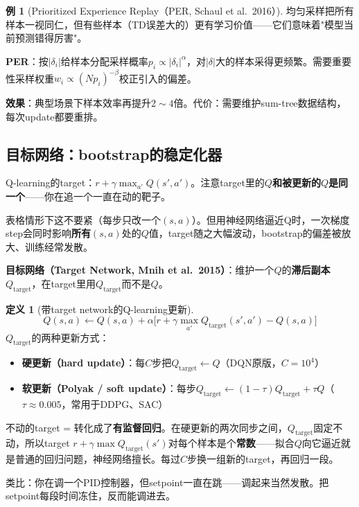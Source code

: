 \documentclass[11pt,a4paper]{article}
\theoremstyle{definition}
\newtheorem{definition}{定义}[section]
\newtheorem{example}{例}[section]
\begin{document}
\begin{example}[Prioritized Experience Replay（PER, Schaul et al.\ 2016）]
均匀采样把所有样本一视同仁，但有些样本（TD误差大的）更有学习价值——它们意味着"模型当前预测错得厉害"。

\textbf{PER}：按$|\delta_i|$给样本分配采样概率$p_i \propto |\delta_i|^\alpha$，对$|\delta|$大的样本采得更频繁。需要重要性采样权重$w_i \propto (Np_i)^{-\beta}$校正引入的偏差。

\textbf{效果}：典型场景下样本效率再提升$2\sim 4$倍。代价：需要维护sum-tree数据结构，每次update都要重排。
\end{example}

\subsection{目标网络：bootstrap的稳定化器}

\begin{plainwords}
Q-learning的target：$r + \gamma\max_{a'} Q(s', a')$。注意target里的$Q$\textbf{和被更新的$Q$是同一个}——你在追一个一直在动的靶子。

表格情形下这不要紧（每步只改一个$(s,a)$）。但用神经网络逼近Q时，一次梯度step会同时影响\textbf{所有}$(s, a)$处的$Q$值，target随之大幅波动，bootstrap的偏差被放大、训练经常发散。

\textbf{目标网络（Target Network, Mnih et al.\ 2015）}：维护一个$Q$的\textbf{滞后副本}$Q_{\text{target}}$，在target里用$Q_{\text{target}}$而不是$Q$。
\end{plainwords}

\begin{definition}[带target network的Q-learning更新]
\[
Q(s,a) \leftarrow Q(s,a) + \alpha\Big[r + \gamma\max_{a'} Q_{\text{target}}(s', a') - Q(s,a)\Big]
\]
$Q_{\text{target}}$的两种更新方式：
\begin{itemize}
\item \textbf{硬更新（hard update）}：每$C$步把$Q_{\text{target}} \leftarrow Q$（DQN原版，$C=10^4$）
\item \textbf{软更新（Polyak / soft update）}：每步$Q_{\text{target}} \leftarrow (1-\tau)Q_{\text{target}} + \tau Q$（$\tau \approx 0.005$，常用于DDPG、SAC）
\end{itemize}
\end{definition}

\begin{intuition}[为什么这样稳定]
不动的target = 转化成了\textbf{有监督回归}。在硬更新的两次同步之间，$Q_{\text{target}}$固定不动，所以target $r + \gamma\max Q_{\text{target}}(s')$对每个样本是个\textbf{常数}——拟合$Q$向它逼近就是普通的回归问题，神经网络擅长。每过$C$步换一组新的target，再回归一段。

类比：你在调一个PID控制器，但setpoint一直在跳——调起来当然发散。把setpoint每段时间冻住，反而能调进去。
\end{intuition}
\end{document}
